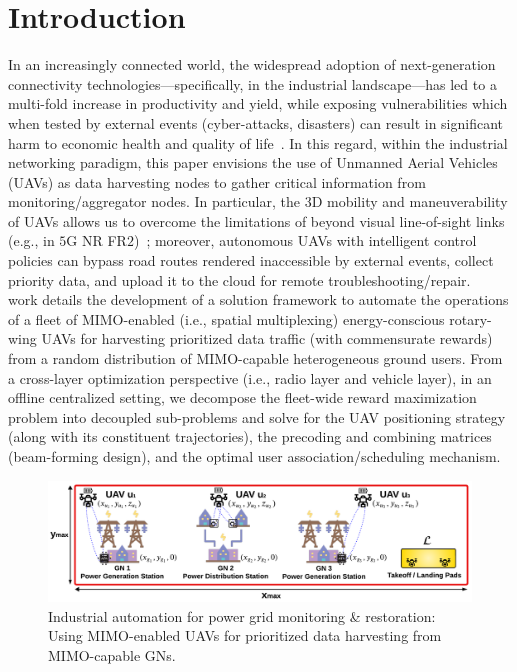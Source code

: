 \documentclass[10pt, twocolumn]{IEEEtran}
\begin{document}
\section{Introduction}\label{S1}
In an increasingly connected world, the widespread adoption of next-generation connectivity technologies---specifically, in the industrial landscape---has led to a multi-fold increase in productivity and yield, while exposing vulnerabilities which when tested by external events (cyber-attacks, disasters) can result in significant harm to economic health and quality of life~\cite{Motivation_1, Motivation_2}. In this regard, within the industrial networking paradigm, this paper envisions the use of Unmanned Aerial Vehicles (UAVs) as data harvesting nodes to gather critical information from monitoring/aggregator nodes. In particular, the $3$D mobility and maneuverability of UAVs allows us to overcome the limitations of beyond visual line-of-sight links (e.g., in $5$G NR FR$2$)~\cite{MAESTRO_TCCN, SPAVE_ICC}; moreover, autonomous UAVs with intelligent control policies can bypass road routes rendered inaccessible by external events, collect priority data, and upload it to the cloud for remote troubleshooting/repair.\\
 work details the development of a solution framework to automate the operations of a fleet of MIMO-enabled (i.e., spatial multiplexing) energy-conscious rotary-wing UAVs for harvesting prioritized data traffic (with commensurate rewards) from a random distribution of MIMO-capable heterogeneous ground users. From a cross-layer optimization perspective (i.e., radio layer and vehicle layer), in an offline centralized setting, we decompose the fleet-wide reward maximization problem into decoupled sub-problems and solve for the UAV positioning strategy (along with its constituent trajectories), the precoding and combining matrices (beam-forming design), and the optimal user association/scheduling mechanism.
\begin{figure}[t]
     \centering
     \includegraphics[width=0.8185\linewidth]{figs/deployment_model.pdf}
     \vspace{-2mm}
     \caption{Industrial automation for power grid monitoring \& restoration: Using MIMO-enabled UAVs for prioritized data harvesting from MIMO-capable GNs.}
     \vspace{-6mm}
     \label{F1}
\end{figure}
\end{document}
